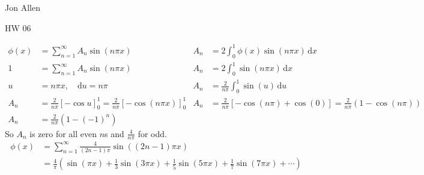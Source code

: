 \documentclass{article}
\begin{document}
Jon Allen

HW 06

\begin{align*}
  \phi(x)&=\sum\limits_{n=1}^\infty{A_n\sin(n\pi x)}&A_n&=2\int_0^1{\phi(x)\sin(n\pi x)\,\mathrm{d}x}\\
  1&=\sum\limits_{n=1}^\infty{A_n\sin(n\pi x)}&A_n&=2\int_0^1{\sin(n\pi x)\,\mathrm{d}x}\\
  u&=n\pi x,\quad \mathrm{d}u=n\pi & A_n&=\frac{2}{n\pi}\int_0^1{\sin(u)\,\mathrm{d}u}\\
  A_n&=\frac{2}{n\pi}\left[-\cos u\right]_0^1=\frac{2}{n\pi}\left[-\cos(n\pi x)\right]_0^1
  &A_n&=\frac{2}{n\pi}\left[-\cos(n\pi)+\cos(0)\right]=\frac{2}{n\pi}\left(1-\cos(n\pi)\right)\\
  A_n&=\frac{2}{n\pi}\left(1-(-1)^n\right)
\end{align*}
So $A_n$ is zero for all even $n$s and $\frac{4}{n\pi}$ for odd.
\begin{align*}
  \phi(x)&=\sum\limits_{n=1}^\infty{\frac{4}{(2n-1)\pi}\sin((2n-1)\pi x)}\\
  &=\frac{4}{\pi}\left(\sin(\pi x)+\frac{1}{3}\sin(3\pi x)+\frac{1}{5}\sin(5\pi x)+\frac{1}{7}\sin(7\pi x)+\cdots\right)
\end{align*}
    
\end{document}

